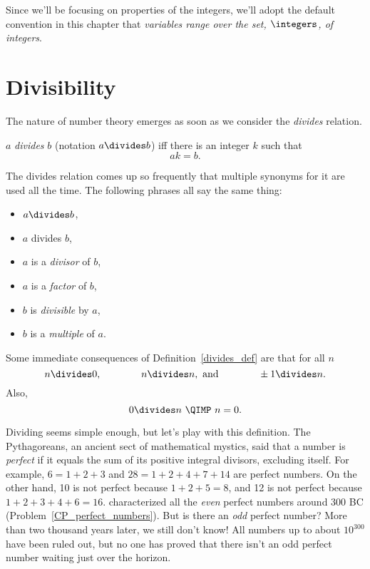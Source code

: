 
Since we'll be focusing on properties of the integers, we'll adopt the
default convention in this chapter that \emph{variables range over
  the set, $\integers$, of integers}.

\section{Divisibility}\label{divisibility_sec}

The nature of number theory emerges as soon as we consider the \emph{divides}%
relation.
\begin{definition}\label{divides_def}
$a$ \emph{divides} $b$ (notation $a \divides b$) iff there is an integer $k$ such that
\[
ak = b.
\]
\end{definition}
The divides relation comes up so frequently that multiple synonyms for it are used all the
time.  The following phrases all say the same thing:
\begin{itemize}
\item $a \divides b$,
\item $a$ divides $b$,
\item $a$ is a \emph{divisor} of $b$,
\item $a$ is a \emph{factor} of $b$,
\item $b$ is \emph{divisible} by $a$,
\item $b$ is a \emph{multiple} of $a$.
\end{itemize}
Some immediate consequences of Definition~\ref{divides_def} are that for
all $n$
\[
n  \divides 0,\qquad\qquad
n  \divides n, \text{ and}\qquad\qquad
\pm1  \divides n.
\]
Also,
\[
0 \divides n\ \QIMP\ n = 0.
\]

Dividing seems simple enough, but let's play with this definition.  The Pythagoreans, an
ancient sect of mathematical mystics, said that a number is \emph{perfect}%
if it equals the sum of its positive 
integral divisors, excluding itself.  For example, $6 = 1 + 2 + 3$ 
and $28 = 1 + 2 + 4 + 7 + 14$ are perfect numbers.
On the other hand, 10 is not perfect because 
$1 + 2 + 5 = 8$, and 12 is not perfect because
$1 + 2 + 3 + 4 + 6 = 16$.   characterized all the 
\emph{even} perfect numbers
around 300 BC (Problem~\ref{CP_perfect_numbers}).  But is there an \emph{odd} perfect
number?  More than two thousand years later, we still don't know!  
All numbers up to about
$10^{300}$ have been ruled out, but no one has proved that there isn't an odd perfect
number waiting just over the horizon.

